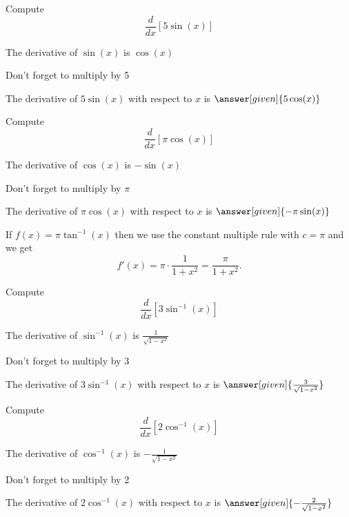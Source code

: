 \documentclass{ximera}
\begin{document}
\begin{problem} %
  Compute 
  \[
  \frac{d}{dx} \left[5\sin(x)\right]
  \]
  
    \begin{hint}
      The derivative of $\sin(x)$ is $\cos(x)$
    \end{hint}
		\begin{hint}
		  Don't forget to multiply by 5
		\end{hint}
		The derivative of $5\sin(x)$ with respect to $x$ is
		 $\answer[given]{5\cos(x)}$
	
\end{problem}


\begin{problem} %
  Compute 
  \[
  \frac{d}{dx} \left[\pi\cos(x)\right]
  \]
  
    \begin{hint}
      The derivative of $\cos(x)$ is $-\sin(x)$
    \end{hint}
		\begin{hint}
		  Don't forget to multiply by $\pi$
		\end{hint}
		
		The derivative of $\pi\cos(x)$ with respect to $x$ is
		 $\answer[given]{-\pi\sin(x)}$
	
\end{problem}


\begin{example} %
 If $f(x) = \pi\tan^{-1}(x)$ then we use the constant multiple rule with $c = \pi$ and we get 
\[
f'(x) =  \pi \cdot \frac{1}{1+x^2}= \frac{\pi}{1+x^2}.
\]
\end{example}

\begin{problem} %
  Compute 
  \[
  \frac{d}{dx} \left[3\sin^{-1}(x)\right]
  \]
  
    \begin{hint}
      The derivative of $\sin^{-1}(x)$ is $\frac{1}{\sqrt{1-x^2}}$
    \end{hint} 
		\begin{hint}
		  Don't forget to multiply by 3
		\end{hint}
		
		The derivative of $3\sin^{-1}(x)$ with respect to $x$ is
		 $\answer[given]{\frac{3}{\sqrt{1-x^2}}}$
	
\end{problem}

\begin{problem} %
  Compute 
  \[
  \frac{d}{dx} \left[2\cos^{-1}(x)\right]
  \]
  
    \begin{hint}
      The derivative of $\cos^{-1}(x)$ is $-\frac{1}{\sqrt{1-x^2}}$
    \end{hint}
		\begin{hint}
		  Don't forget to multiply by 2
		\end{hint}
		The derivative of $2\cos^{-1}(x)$ with respect to $x$ is
		 $\answer[given]{-\frac{2}{\sqrt{1-x^2}}}$
	
\end{problem}
\end{document}
